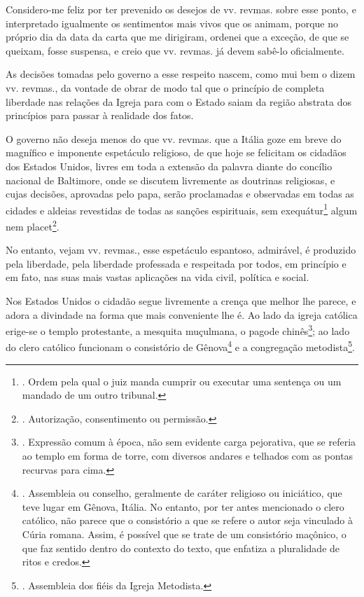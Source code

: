 Considero-me feliz por ter prevenido os desejos de vv. revmas. sobre
esse ponto, e interpretado igualmente os sentimentos mais vivos que os
animam, porque no próprio dia da data da carta que me dirigiram, ordenei
que a exceção, de que se queixam, fosse suspensa, e creio que vv.
revmas. já devem sabê-lo oficialmente.

As decisões tomadas pelo governo a esse respeito nascem, como mui bem o
dizem vv. revmas., da vontade de obrar de modo tal que o princípio de
completa liberdade nas relações da Igreja para com o Estado saiam da
região abstrata dos princípios para passar à realidade dos fatos.

O governo não deseja menos do que vv. revmas. que a Itália goze em breve
do magnífico e imponente espetáculo religioso, de que hoje se felicitam
os cidadãos dos Estados Unidos, livres em toda a extensão da palavra
diante do concílio nacional de Baltimore, onde se discutem livremente as
doutrinas religiosas, e cujas decisões, aprovadas pelo papa, serão
proclamadas e observadas em todas as cidades e aldeias revestidas de
todas as sanções espirituais, sem exequátur\footnote{. Ordem pela qual o
  juiz manda cumprir ou executar uma sentença ou um mandado de um outro
  tribunal.} algum nem placet\footnote{. Autorização, consentimento ou
  permissão.}.

No entanto, vejam vv. revmas., esse espetáculo espantoso, admirável, é
produzido pela liberdade, pela liberdade professada e respeitada por
todos, em princípio e em fato, nas suas mais vastas aplicações na vida
civil, política e social.

Nos Estados Unidos o cidadão segue livremente a crença que melhor lhe
parece, e adora a divindade na forma que mais conveniente lhe é. Ao lado
da igreja católica erige-se o templo protestante, a mesquita muçulmana,
o pagode chinês\footnote{. Expressão comum à época, não sem evidente
  carga pejorativa, que se referia ao templo em forma de torre, com
  diversos andares e telhados com as pontas recurvas para cima.}; ao
lado do clero católico funcionam o consistório de Gênova\footnote{.
  Assembleia ou conselho, geralmente de caráter religioso ou iniciático,
  que teve lugar em Gênova, Itália. No entanto, por ter antes mencionado
  o clero católico, não parece que o consistório a que se refere o autor
  seja vinculado à Cúria romana. Assim, é possível que se trate de um
  consistório maçônico, o que faz sentido dentro do contexto do texto,
  que enfatiza a pluralidade de ritos e credos.} e a congregação
metodista\footnote{. Assembleia dos fiéis da Igreja Metodista.}.


